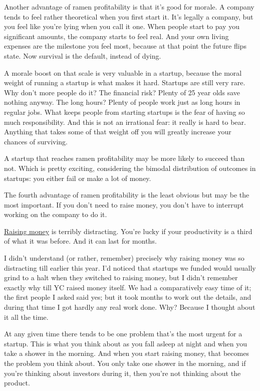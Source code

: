 Another advantage of ramen profitability is that it's good for morale. A
company tends to feel rather theoretical when you first start it. It's
legally a company, but you feel like you're lying when you call it one.
When people start to pay you significant amounts, the company starts to
feel real. And your own living expenses are the milestone you feel most,
because at that point the future flips state. Now survival is the
default, instead of dying.

A morale boost on that scale is very valuable in a startup, because the
moral weight of running a startup is what makes it hard. Startups are
still very rare. Why don't more people do it? The financial risk? Plenty
of 25 year olds save nothing anyway. The long hours? Plenty of people
work just as long hours in regular jobs. What keeps people from starting
startups is the fear of having so much responsibility. And this is not
an irrational fear: it really is hard to bear. Anything that takes some
of that weight off you will greatly increase your chances of surviving.

A startup that reaches ramen profitability may be more likely to succeed
than not. Which is pretty exciting, considering the bimodal distribution
of outcomes in startups: you either fail or make a lot of money.

The fourth advantage of ramen profitability is the least obvious but may
be the most important. If you don't need to raise money, you don't have
to interrupt working on the company to do it.

\href{fundraising.html}{Raising money} is terribly distracting. You're
lucky if your productivity is a third of what it was before. And it can
last for months.

I didn't understand (or rather, remember) precisely why raising money
was so distracting till earlier this year. I'd noticed that startups we
funded would usually grind to a halt when they switched to raising
money, but I didn't remember exactly why till YC raised money itself. We
had a comparatively easy time of it; the first people I asked said yes;
but it took months to work out the details, and during that time I got
hardly any real work done. Why? Because I thought about it all the time.

At any given time there tends to be one problem that's the most urgent
for a startup. This is what you think about as you fall asleep at night
and when you take a shower in the morning. And when you start raising
money, that becomes the problem you think about. You only take one
shower in the morning, and if you're thinking about investors during it,
then you're not thinking about the product.

